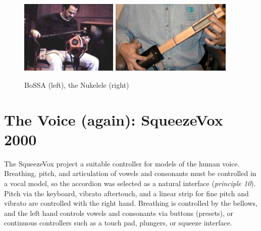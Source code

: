 \begin{figure}[t]
\centering
\includegraphics[height=35mm]{Figure9BoSSA.jpg}  
\includegraphics[height=35mm]{Figure10Nukelele.jpg}
\caption{BoSSA (left), the Nukelele (right)}
\label{Cook:cook-fig:7}       %
\end{figure}


\section{The Voice (again): SqueezeVox    2000}

The SqueezeVox project \cite{Cook:2000} a suitable controller for models of the human voice. 
Breathing, pitch, and articulation of vowels and consonants must be controlled in
a vocal model, so  the accordion was selected as a natural interface
(\textit{principle 10}).  Pitch via the keyboard, vibrato aftertouch, and a
linear strip for fine pitch and vibrato are controlled with the right hand. 
Breathing is controlled by the bellows, and the left hand controls vowels and
consonants via buttons (presets), or continuous controllers such as a touch pad,
plungers, or squeeze interface.

